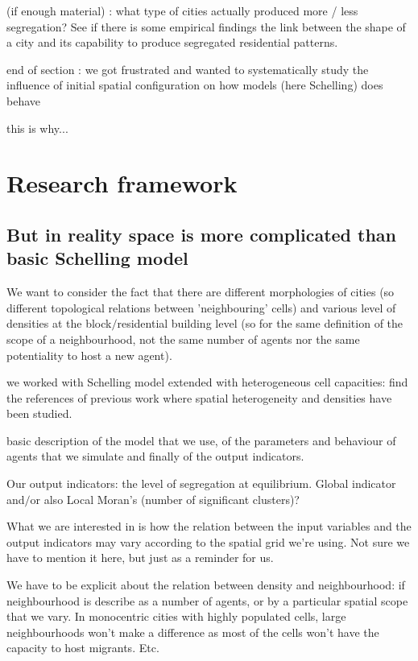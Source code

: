 \documentclass[a4paper,12pt]{article}
\begin{document}
(if enough material) : what type of cities actually produced more / less segregation?
See if there is some empirical findings the link between the shape of a city and its capability to produce segregated residential patterns.

end of section : we got frustrated and wanted to systematically study the influence of initial spatial configuration on how models (here Schelling) does behave

this is why...


\section{Research framework}


\subsection{But in reality space is more complicated than basic Schelling model}

We want to consider the fact that there are different morphologies of cities (so different topological relations between 'neighbouring' cells) and various level of densities at the block$/$residential building level (so for the same definition of the scope of a neighbourhood, not the same number of agents nor the same potentiality to host a new agent).

we worked with Schelling model extended with heterogeneous cell capacities: find the references of previous work where spatial heterogeneity and densities have been studied.

basic description of the model that we use, of the parameters and behaviour of agents that we simulate and finally of the output indicators.

Our output indicators: the level of segregation at equilibrium. Global indicator and$/$or also Local Moran's (number of significant clusters)?

What we are interested in is how the relation between the input variables and the output indicators may vary according to the spatial grid we're using. Not sure we have to mention it here, but just as a reminder for us.

We have to be explicit about the relation between density and neighbourhood: if neighbourhood is describe as a number of agents, or by a particular spatial scope that we vary. In monocentric cities with highly populated cells, large neighbourhoods won't make a difference as most of the cells won't have the capacity to host migrants. Etc.
\end{document}
